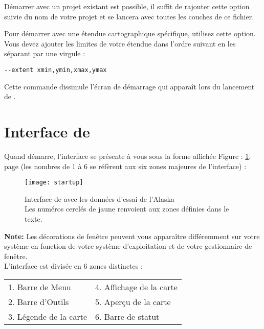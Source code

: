 Démarrer \qg avec un projet existant est possible, il suffit de rajouter cette option suivie du nom de votre projet et \qg se lancera avec toutes les couches de ce fichier.

Pour démarrer avec une étendue cartographique spécifique, utilisez cette option. Vous devez ajouter les limites de votre étendue dans l'ordre suivant en les séparant par une virgule :
\begin{verbatim}
--extent xmin,ymin,xmax,ymax
\end{verbatim}

Cette commande dissimule l'écran de démarrage qui apparaît lors du lancement de \qg.

\section{Interface de \qg}
\label{label_qgismainwindow}

Quand \qg démarre, l'interface se présente à vous sous la forme affichée Figure : \ref{fig:startup}, page \pageref{fig:startup} (les nombres de 1 à 6 se réfèrent aux six zones majeures de l'interface) :

\begin{figure}[ht]
   \begin{center}
   \texttt{[image: startup]}
   \caption{Interface de \qg avec les données d'essai de l'Alaska \nixcaption\\
   Les numéros cerclés de jaune renvoient aux zones définies dans le texte.}
   \label{fig:startup}
\end{center} 
\end{figure}

\textbf{Note:} Les décorations de fenêtre peuvent vous apparaître différemment sur votre système en fonction de votre système d'exploitation et de votre gestionnaire de fenêtre. \\

L'interface est divisée en 6 zones distinctes :
\begin{center}
\begin{tabular}{p{5cm} p{5cm}}
1. Barre de Menu & 4. Affichage de la carte\\
2. Barre d'Outils & 5. Aperçu de la carte  \\
3. Légende de la carte & 6. Barre de statut \\  
\end{tabular}
\end{center}

